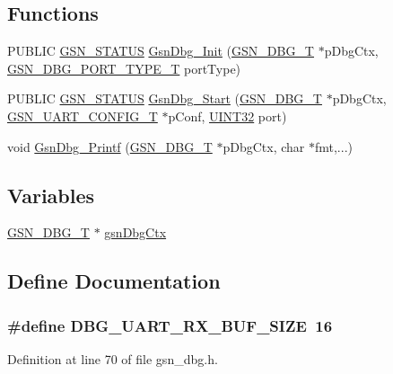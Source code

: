 \subsection*{Functions}
\begin{DoxyCompactItemize}
\item 
PUBLIC \hyperlink{a00660_gada5951904ac6110b1fa95e51a9ddc217}{GSN\_\-STATUS} \hyperlink{a00480_a696e3a7199b8dfda455a657e358cf7bc}{GsnDbg\_\-Init} (\hyperlink{a00042}{GSN\_\-DBG\_\-T} $\ast$pDbgCtx, \hyperlink{a00480_a42632950cffc518e7b58d4661584b8a9}{GSN\_\-DBG\_\-PORT\_\-TYPE\_\-T} portType)
\item 
PUBLIC \hyperlink{a00660_gada5951904ac6110b1fa95e51a9ddc217}{GSN\_\-STATUS} \hyperlink{a00480_a280e286daee7dbf3388c1f1b0be386cb}{GsnDbg\_\-Start} (\hyperlink{a00042}{GSN\_\-DBG\_\-T} $\ast$pDbgCtx, \hyperlink{a00268}{GSN\_\-UART\_\-CONFIG\_\-T} $\ast$pConf, \hyperlink{a00660_gae1e6edbbc26d6fbc71a90190d0266018}{UINT32} port)
\item 
void \hyperlink{a00480_ae085902bd370094b777020dc28bea748}{GsnDbg\_\-Printf} (\hyperlink{a00042}{GSN\_\-DBG\_\-T} $\ast$pDbgCtx, char $\ast$fmt,...)
\end{DoxyCompactItemize}
\subsection*{Variables}
\begin{DoxyCompactItemize}
\item 
\hyperlink{a00042}{GSN\_\-DBG\_\-T} $\ast$ \hyperlink{a00480_a0ea54aaf70383854541f75f1c3345976}{gsnDbgCtx}
\end{DoxyCompactItemize}


\subsection{Define Documentation}
\hypertarget{a00480_aba8405c0cf90d3089bbf3f9c245f4c3c}{
\subsubsection[{DBG\_\-UART\_\-RX\_\-BUF\_\-SIZE}]{\setlength{\rightskip}{0pt plus 5cm}\#define DBG\_\-UART\_\-RX\_\-BUF\_\-SIZE~16}}
\label{a00480_aba8405c0cf90d3089bbf3f9c245f4c3c}


Definition at line 70 of file gsn\_\-dbg.h.

